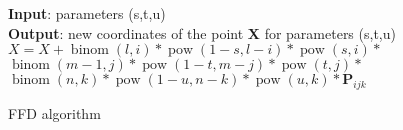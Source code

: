 \begin{algorithm}[!ht]
\SetAlgoNoLine
\textbf{Input}: parameters (s,t,u)\\
\textbf{Output}: new coordinates of the point \textbf{X} for parameters (s,t,u)\\
  {
    {
        {
        $X=X+\operatorname{binom}(l, i) * \operatorname{pow}(1-s, l-i) * \operatorname{pow}(s, i) *$
$\operatorname{binom}(m-1, j) * \operatorname{pow}(1-t, m-j) * \operatorname{pow}(t, j) *$
$\operatorname{binom}(n, k) * \operatorname{pow}(1-u, n-k) * \operatorname{pow}(u, k) * \boldsymbol{P}_{i j k}$
        }
    }
  }
 \caption{FFD algorithm}
 \label{ffd_algorithm}
\end{algorithm}